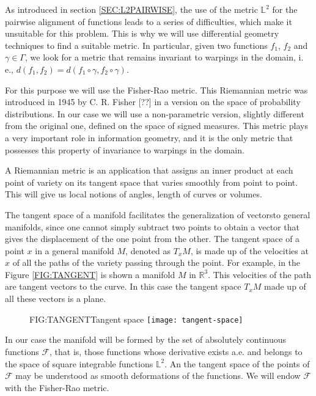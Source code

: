 As introduced in section \ref{SEC:L2PAIRWISE}, the use of the metric $\mathbb{L}^2$
for the pairwise alignment of functions leads to a series of difficulties, which make
it unsuitable for this problem. This is why we will use differential
geometry techniques to find a suitable metric. In particular, given two
functions $f_1$, $f_2$ and $\gamma \in \Gamma$, we look for a metric that
remains invariant to warpings in the domain, i. e.,
$d(f_1, f_2) = d(f_1 \circ \gamma, f_2 \circ \gamma)$.

For this purpose we will use the Fisher-Rao metric. This Riemannian metric was
introduced in 1945 by C. R. Fisher [??] in a version on the
space of probability distributions. In our case we will use a non-parametric
version, slightly different from the original one, defined on the space of
signed measures. This metric plays a very important role in information
geometry, and it is the only metric that possesses this property of
invariance to warpings in the domain\cite{Cencov1982}.

A Riemannian metric is an application that assigns an inner product at each
point of variety on its tangent space that varies smoothly from point to point.
This will give us local notions of angles, length of curves or volumes.

The tangent space of a manifold facilitates the generalization of
vectorsto general manifolds, since one
cannot simply subtract two points to obtain a vector that gives the displacement
of the one point from the other. The tangent space of a point $x$ in a general
manifold $M$, denoted as $T_xM$, is made up of the velocities at $x$ of all the
paths of the variety passing through the point. For example, in the Figure
\ref{FIG:TANGENT} is shown a manifold $M$ in $\mathbb{R}^3$. This velocities of
the path are tangent vectors to the curve. In this case the tangent space $T_xM$
made up of all these vectors is a plane.

\begin{figure}[Tangent space]{FIG:TANGENT}{Tangent space}
  \texttt{[image: tangent-space]}
\end{figure}

In our case the manifold will be formed by the set of absolutely continuous
functions $\mathcal{F}$, that is, those functions whose derivative exists a.e.
and belongs to the space of square integrable functions $\mathbb{L}^2$. An
the tangent space of the points of $\mathcal{F}$ may be understood as smooth
deformations of the functions.
We will endow $\mathcal{F}$ with the Fisher-Rao metric.

